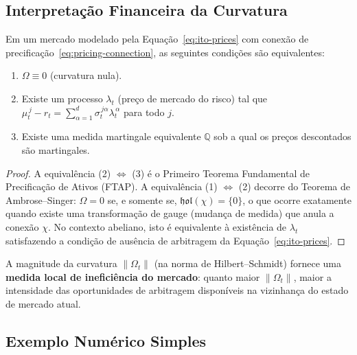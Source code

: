 \subsection{Interpreta\c{c}\~ao Financeira da Curvatura}

\begin{prop}\label{prop:no-arbitrage-condition}
Em um mercado modelado pela Equa\c{c}\~ao~\eqref{eq:ito-prices} com conex\~ao de precifica\c{c}\~ao~\eqref{eq:pricing-connection}, as seguintes condi\c{c}\~oes s\~ao equivalentes:
\begin{enumerate}
 \item \(\Omega \equiv 0\) (curvatura nula).
 \item Existe um processo \(\lambda_t\) (pre\c{c}o de mercado do risco) tal que \(\mu_t^{\,j} - r_t = \sum_{\alpha=1}^{d} \sigma_t^{\,j\alpha} \lambda_t^{\,\alpha}\) para todo \(j\).
 \item Existe uma medida martingale equivalente \(\mathbb{Q}\) sob a qual os pre\c{c}os descontados s\~ao martingales.
\end{enumerate}
\end{prop}

\begin{proof}
A equival\^encia (2) \(\Leftrightarrow\) (3) \'e o Primeiro Teorema Fundamental de Precifica\c{c}\~ao de Ativos (FTAP). A equival\^encia (1) \(\Leftrightarrow\) (2) decorre do Teorema de Ambrose--Singer: \(\Omega = 0\) se, e somente se, \(\mathfrak{hol}(\chi) = \{0\}\), o que ocorre exatamente quando existe uma transforma\c{c}\~ao de gauge (mudan\c{c}a de medida) que anula a conex\~ao \(\chi\). No contexto abeliano, isto \'e equivalente \`a exist\^encia de \(\lambda_t\) satisfazendo a condi\c{c}\~ao de aus\^encia de arbitragem da Equa\c{c}\~ao~\eqref{eq:ito-prices}.
\end{proof}

\begin{prop}\label{prop:curvature-inefficiency}
A magnitude da curvatura \(\|\Omega_t\|\) (na norma de Hilbert--Schmidt) fornece uma \textbf{medida local de inefici\^encia do mercado}: quanto maior \(\|\Omega_t\|\), maior a intensidade das oportunidades de arbitragem dispon\'iveis na vizinhan\c{c}a do estado de mercado atual.
\end{prop}

\subsection{Exemplo Num\'erico Simples}


